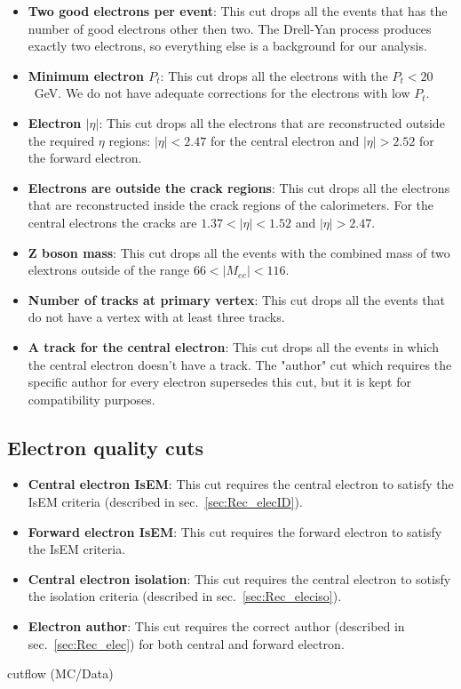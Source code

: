 \begin{itemize}
\item {\bfseries Two good electrons per event}: This cut drops all the events that has the number of good electrons other then two. The Drell-Yan process produces exactly two electrons, so everything else is a background for our analysis.
\item {\bfseries Minimum electron $P_{t}$}: This cut drops all the electrons with the $P_{t} < 20$~GeV. We do not have adequate corrections for the electrons with low $P_{t}$.
\item {\bfseries Electron $|\eta|$}: This cut drops all the electrons that are reconstructed outside the required $\eta$ regions: $|\eta| < 2.47$ for the central electron and $|\eta| > 2.52$ for the forward electron.
\item {\bfseries Electrons are outside the crack regions}: This cut drops all the electrons that are reconstructed inside the crack regions of the calorimeters. For the central electrons the cracks are $1.37 < |\eta| < 1.52$ and $|\eta| > 2.47$.
\item {\bfseries Z boson mass}: This cut drops all the events with the combined mass of two elextrons outside of the range $66 < |M_{ee}| < 116$.
\item {\bfseries Number of tracks at primary vertex}: This cut drops all the events that do not have a vertex with at least three tracks.
\item {\bfseries A track for the central electron}: This cut drops all the events in which the central electron doesn't have a track. The "author" cut which requires the specific author for every electron supersedes this cut, but it is kept for compatibility purposes.
\end{itemize}

\subsection{Electron quality cuts}
\label{sec:Sel_isem_iso}

\begin{itemize}
\item {\bfseries Central electron IsEM}: This cut requires the central electron to satisfy the IsEM criteria (described in sec.~\ref{sec:Rec_elecID}).
\item {\bfseries Forward electron IsEM}: This cut requires the forward electron to satisfy the IsEM criteria.
\item {\bfseries Central electron isolation}: This cut requires the central electron to sotisfy the isolation criteria (described in sec.~\ref{sec:Rec_eleciso}).
\item {\bfseries Electron author}: This cut requires the correct author (described in sec.~\ref{sec:Rec_elec}) for both central and forward electron.
\end{itemize}

\tbu cutflow (MC/Data)
